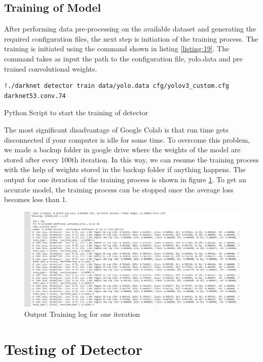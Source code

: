 \subsection{Training of Model}
After performing data pre-processing on the available dataset and generating the required configuration files, the next step 
is initiation  of the training process. The training is initiated using the command shown in listing \ref{listing:19}. The command takes as input the path to the configuration file, yolo.data and pre trained convolutional weights.
\begin{longlisting}
\begin{verbatim}
!./darknet detector train data/yolo.data cfg/yolov3_custom.cfg darknet53.conv.74 
\end{verbatim}
\caption{Python Script to start the training of detector}
\label{listing:19}
\end{longlisting}
The most significant disadvantage of Google Colab is that run time gets disconnected if your computer is idle for some time. To overcome this problem, we made a backup folder in google drive where the weights of the model are stored after every 100th iteration. In this way, we can resume the training process with the help of weights stored in the backup folder if anything happens. The output for one iteration of the training process is shown in figure \ref{fig:5.8}. To get an accurate model, the training process can be stopped once the average loss becomes less than 1. 

\begin{figure}
\centering
\captionsetup{justification = centering}
\includegraphics[scale= 0.55]{CHAPTERS/Chapter-5/images/5.8.PNG}
\caption{ Output Training log for one iteration } 
\label{fig:5.8}
\end{figure}

\section{Testing of Detector}

